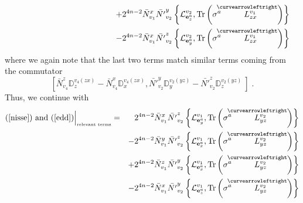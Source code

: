 \documentclass[12pt]{article}
\newcommand{\nn}{\nonumber}
\def\cl{{\cal L}}
\begin{document}
\begin{appendix}
\begin{eqnarray}
 \nn\\
 &&\hspace{4cm}
+2^{4n-2} \bar{N}_{v_1}^x \bar{N'}_{v_2}^y \left\{     \cl^{v_2}_{{\bf e}^a_z}    , \mbox{Tr} \left( \sigma^a  \stackrel{\hspace{-3mm}\curvearrowleftright}{L^{v_1}_{zx}} \right)   \right\}
 \nn\\
 &&\hspace{4cm}
- 2^{4n-2} \bar{N}_{v_1}^x\bar{N'}_{v_2}^z \left\{     \cl^{v_2}_{{\bf e}^a_y}    , \mbox{Tr} \left( \sigma^a  \stackrel{\hspace{-3mm}\curvearrowleftright}{L^{v_1}_{zx}} \right) \right\}
\label{edd}
\end{eqnarray}
where we again note that the last two terms match similar terms coming from the commutator
$$
\left[ \bar{N}^z_{v_4} \mathds{D}^{v_4(zx)}_z -\bar{N}^x_{v_4} \mathds{D}^{v_4(zx)}_x   ,    \bar{N'}^y_{v_2} \mathds{D}^{v_2(yz)}_{y} -   \bar{N'}^z_{v_2} \mathds{D}^{v_2(yz)}_{z}\   \right] \;.
$$
Thus, we continue with
\begin{eqnarray}
\mbox{(\ref{nisse}) and (\ref{edd})}\Big\vert_{\mbox{\tiny relevant terms}} =%
%
&&%
2^{4n-2}  \bar{N}_{v_1}^x \bar{N'}_{v_2}^z \left\{     \cl^{v_1}_{{\bf e}^a_y}    , \mbox{Tr} \left( \sigma^a  \stackrel{\hspace{-3mm}\curvearrowleftright}{L^{v_2}_{yz}} \right) \right\}
\nn\\
&&%
-2^{4n-2}  \bar{N}_{v_1}^y   \bar{N'}_{v_2}^z \left\{       \cl^{v_1}_{{\bf e}^a_x}   , \mbox{Tr} \left( \sigma^a  \stackrel{\hspace{-3mm}\curvearrowleftright}{L^{v_2}_{yz}} \right) \right\}
\nn\\
&&%
+ 2^{4n-2} \bar{N}_{v_1}^z  \bar{N'}_{v_2}^y \left\{        \cl^{v_1}_{{\bf e}^a_x}    , \mbox{Tr} \left( \sigma^a  \stackrel{\hspace{-3mm}\curvearrowleftright}{L^{v_2}_{yz}} \right) \right\}
 \nn\\
 &&%
-2^{4n-2} \bar{N}_{v_1}^x \bar{N'}_{v_2}^y \left\{        \cl^{v_1}_{{\bf e}^a_z}    , \mbox{Tr} \left( \sigma^a  \stackrel{\hspace{-3mm}\curvearrowleftright}{L^{v_2}_{yz}} \right) \right\}
\label{tordenvejr}
\end{eqnarray}

\end{appendix}
\end{document}
